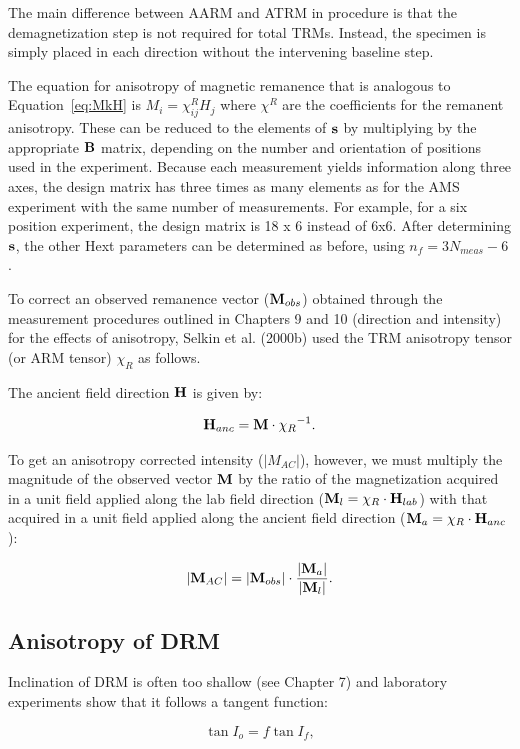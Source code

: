  The main difference between AARM and ATRM in procedure is that the demagnetization step is not required for total  TRMs.  Instead, the specimen is simply placed in each direction without the intervening baseline step.
 
 The equation for anisotropy of magnetic remanence that is analogous to  Equation~\ref{eq:MkH} is $ M_i= \chi^R_{ij} H_j $ where $\chi^R$ are the coefficients for the remanent anisotropy.     These can be reduced to the elements of $\hbox{\bf s}$ by multiplying by the appropriate $\hbox{\bf B}$ matrix, depending on the number and orientation of positions used in the experiment.  Because each measurement yields information along three axes, the design matrix has three times as many elements as for the AMS experiment with the same number of measurements.  For example, for a six position experiment, the design matrix is 18 x 6 instead of 6x6.      After determining $\hbox{\bf s}$, the other Hext parameters can be determined as before, using $n_f=3N_{meas} -6$.
 
 To correct an observed remanence vector ($\hbox{\bf M}_{obs}$) obtained through the measurement procedures outlined in Chapters 9 and 10 (direction and intensity) for the effects of anisotropy, 
 Selkin et al. (2000b) 
 \nocite{selkin00b} 
 used  the TRM anisotropy tensor (or ARM tensor) $\chi_R$ as follows.  
 
 The ancient field direction $\hbox{\bf H}$ is given by:
 
 $$
 \hbox{\bf H}_{anc}= \hbox{\bf M} \cdot {\chi_R}^{-1}. 
 $$

\noindent To get an anisotropy corrected intensity ($|M_{AC}|$), however, we must multiply the magnitude of the observed vector $\hbox{\bf M}$ by the ratio of the magnetization acquired in a unit field applied along the lab field direction  ($\hbox{\bf M}_l = \chi_R \cdot  { \hbox{\bf H}_{lab}}$)  with that acquired in a unit field applied along the ancient field direction ($\hbox{\bf M}_a=\chi_R \cdot {\hbox{\bf H}_{anc}}$):

$$
|\hbox{\bf M}_{AC}| =  |\hbox{\bf M}_{obs}| \cdot {  {|\hbox{\bf M}_a|} \over {|\hbox{\bf M}_l|} }.
$$
 
 \subsection{Anisotropy of DRM}
 
Inclination of DRM is often too shallow (see Chapter 7) and  laboratory experiments show that it follows a tangent function:
 
\begin{equation}
\tan I_o = f\tan I_f,
\label{eq:flattening}
\end{equation}


